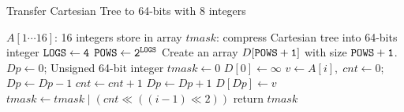 \begin{algorithm}[!thb]
  \caption{Transfer Cartesian Tree to 64-bits with 8 integers}
  \label{alg:cartesian-to-64bits}
  \begin{algorithmic}[1]
    \Require
      $A[1 \cdots 16]$: 16 integers store in array
    \Ensure 
      $\textit{tmask}$: compress Cartesian tree into 64-bits integer
      \State $\tt{LOGS} \gets 4$
      \State $\tt{POWS} \gets 2^{\tt{LOGS}}$
      \State Create an array $D[\tt{POWS}+1]$ with size $\tt{POWS}+1$.
      \State $\textit{Dp} \gets 0$;
      \State Unsigned 64-bit integer $\textit{tmask} \gets 0$
      \State $D[0] \gets \infty$
        \State $v \gets A[i], \; \textit{cnt} \gets 0$;
          \State $\textit{Dp} \gets \textit{Dp}-1$
          \State $\textit{cnt} \gets \textit{cnt} + 1$
        \EndWhile
        \State $\textit{Dp} \gets \textit{Dp}+1$
        \State $D[\textit{Dp}] \gets v$
        \State $\textit{tmask} \gets \textit{tmask} \mathrel{|} (cnt \ll ((i-1) \ll 2))$
      \EndFor
      \State return $tmask$
  \end{algorithmic}
\end{algorithm}